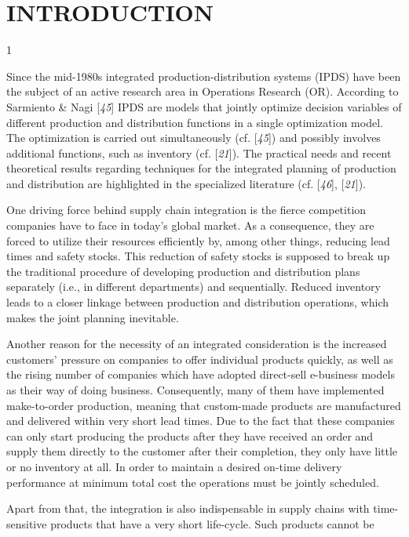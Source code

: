 \section*{INTRODUCTION}1\par Since the mid-1980s integrated production-distribution systems (IPDS) have been the
 subject of an active research area in Operations Research (OR). According to Sarmiento
 \& Nagi [\textit{45}] IPDS are models that jointly
 optimize decision variables of different production and distribution functions in a
 single optimization model. The optimization is carried out simultaneously (cf. [\textit{45}]) and possibly involves additional functions,
 such as inventory (cf. [\textit{21}]). The practical needs
 and recent theoretical results regarding techniques for the integrated planning of
 production and distribution are highlighted in the specialized literature (cf. [\textit{46}], [\textit{21}]).\par One driving force behind supply chain integration is the fierce competition companies
 have to face in today's global market. As a consequence, they are forced to utilize
 their resources efficiently by, among other things, reducing lead times and safety
 stocks. This reduction of safety stocks is supposed to break up the traditional
 procedure of developing production and distribution plans separately (i.e., in different
 departments) and sequentially. Reduced inventory leads to a closer linkage between
 production and distribution operations, which makes the joint planning inevitable.\par Another reason for the necessity of an integrated consideration is the increased
 customers' pressure on companies to offer individual products quickly, as well as the
 rising number of companies which have adopted direct-sell e-business models as their way
 of doing business. Consequently, many of them have implemented make-to-order production,
 meaning that custom-made products are manufactured and delivered within very short lead
 times. Due to the fact that these companies can only start producing the products after
 they have received an order and supply them directly to the customer after their
 completion, they only have little or no inventory at all. In order to maintain a desired
 on-time delivery performance at minimum total cost the operations must be jointly
 scheduled.\par Apart from that, the integration is also indispensable in supply chains with
 time-sensitive products that have a very short life-cycle. Such products cannot be
